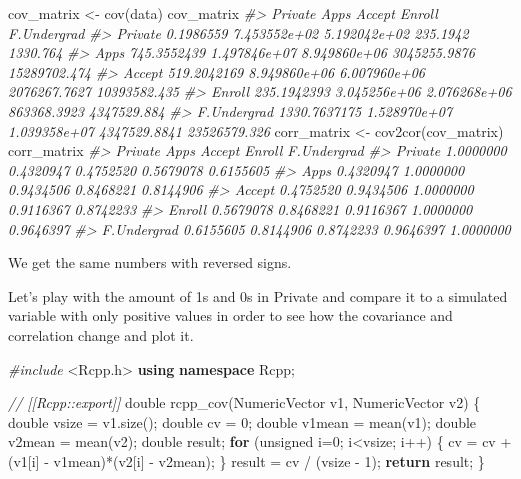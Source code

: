 \documentclass[
]{article}
\newenvironment{Shaded}{\begin{snugshade}}{\end{snugshade}}
\newcommand{\CommentTok}[1]{\textcolor[rgb]{0.56,0.35,0.01}{\textit{#1}}}
\newcommand{\ControlFlowTok}[1]{\textcolor[rgb]{0.13,0.29,0.53}{\textbf{#1}}}
\newcommand{\DataTypeTok}[1]{\textcolor[rgb]{0.13,0.29,0.53}{#1}}
\newcommand{\DecValTok}[1]{\textcolor[rgb]{0.00,0.00,0.81}{#1}}
\newcommand{\FunctionTok}[1]{\textcolor[rgb]{0.00,0.00,0.00}{#1}}
\newcommand{\ImportTok}[1]{#1}
\newcommand{\KeywordTok}[1]{\textcolor[rgb]{0.13,0.29,0.53}{\textbf{#1}}}
\newcommand{\NormalTok}[1]{#1}
\newcommand{\OtherTok}[1]{\textcolor[rgb]{0.56,0.35,0.01}{#1}}
\newcommand{\PreprocessorTok}[1]{\textcolor[rgb]{0.56,0.35,0.01}{\textit{#1}}}
\begin{document}
\begin{Shaded}
\begin{Highlighting}[]
\NormalTok{cov\_matrix }\OtherTok{\textless{}{-}} \FunctionTok{cov}\NormalTok{(data)}
\NormalTok{cov\_matrix}
\CommentTok{\#\textgreater{}                  Private         Apps       Accept       Enroll  F.Undergrad}
\CommentTok{\#\textgreater{} Private        0.1986559 7.453552e+02 5.192042e+02     235.1942     1330.764}
\CommentTok{\#\textgreater{} Apps         745.3552439 1.497846e+07 8.949860e+06 3045255.9876 15289702.474}
\CommentTok{\#\textgreater{} Accept       519.2042169 8.949860e+06 6.007960e+06 2076267.7627 10393582.435}
\CommentTok{\#\textgreater{} Enroll       235.1942393 3.045256e+06 2.076268e+06  863368.3923  4347529.884}
\CommentTok{\#\textgreater{} F.Undergrad 1330.7637175 1.528970e+07 1.039358e+07 4347529.8841 23526579.326}
\NormalTok{corr\_matrix }\OtherTok{\textless{}{-}} \FunctionTok{cov2cor}\NormalTok{(cov\_matrix)}
\NormalTok{corr\_matrix}
\CommentTok{\#\textgreater{}               Private      Apps    Accept    Enroll F.Undergrad}
\CommentTok{\#\textgreater{} Private     1.0000000 0.4320947 0.4752520 0.5679078   0.6155605}
\CommentTok{\#\textgreater{} Apps        0.4320947 1.0000000 0.9434506 0.8468221   0.8144906}
\CommentTok{\#\textgreater{} Accept      0.4752520 0.9434506 1.0000000 0.9116367   0.8742233}
\CommentTok{\#\textgreater{} Enroll      0.5679078 0.8468221 0.9116367 1.0000000   0.9646397}
\CommentTok{\#\textgreater{} F.Undergrad 0.6155605 0.8144906 0.8742233 0.9646397   1.0000000}
\end{Highlighting}
\end{Shaded}

We get the same numbers with reversed signs.

\newpage

Let's play with the amount of 1s and 0s in Private and compare it to a
simulated variable with only positive values in order to see how the
covariance and correlation change and plot it.

\begin{Shaded}
\begin{Highlighting}[]
\PreprocessorTok{\#include }\ImportTok{\textless{}Rcpp.h\textgreater{}}
\KeywordTok{using} \KeywordTok{namespace}\NormalTok{ Rcpp;}

\CommentTok{// [[Rcpp::export]]}
\DataTypeTok{double}\NormalTok{ rcpp\_cov(NumericVector v1, NumericVector v2) \{}
    \DataTypeTok{double}\NormalTok{ vsize = v1.size();}
    \DataTypeTok{double}\NormalTok{ cv = }\DecValTok{0}\NormalTok{;}
    \DataTypeTok{double}\NormalTok{ v1mean = mean(v1);}
    \DataTypeTok{double}\NormalTok{ v2mean = mean(v2);}
    \DataTypeTok{double}\NormalTok{ result;}
    \ControlFlowTok{for}\NormalTok{ (}\DataTypeTok{unsigned}\NormalTok{ i=}\DecValTok{0}\NormalTok{; i\textless{}vsize; i++) \{}
\NormalTok{        cv = cv + (v1[i] {-} v1mean)*(v2[i] {-} v2mean);}
\NormalTok{    \}}
\NormalTok{    result = cv / (vsize {-} }\DecValTok{1}\NormalTok{);}
    \ControlFlowTok{return}\NormalTok{ result;}
\NormalTok{\}}
\end{Highlighting}
\end{Shaded}
\end{document}
